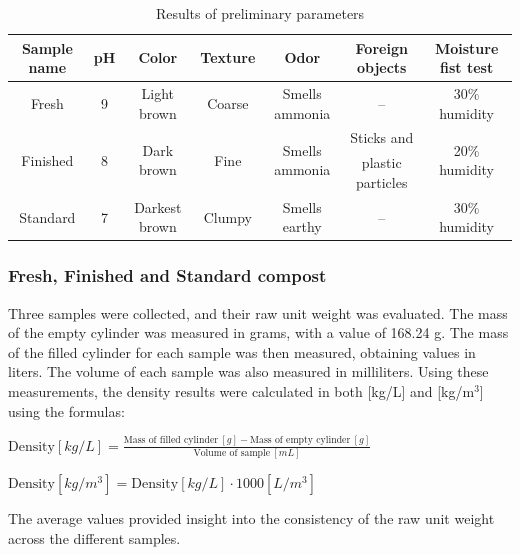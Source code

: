 \documentclass{article}
\begin{document}
\renewcommand{\arraystretch}{1.5}
\begin{table}[ht!]
    \centering \vspace{.3cm}
    \caption{Results of preliminary parameters}
    \hspace*{-.3cm}
    \begin{tabular}{|c|c|c|c|c|c|c|}
        \hline
        \textbf{Sample name} & \textbf{pH} & \textbf{Color} & \textbf{Texture} & \textbf{Odor} & \textbf{Foreign objects} & \textbf{Moisture fist test}\\
        \hline
        Fresh & 9 & Light brown & Coarse & Smells ammonia & -- & 30\% humidity\\
        \hline                                                                   
        \multirow{2}{*}{Finished} & \multirow{2}{*}{8} & \multirow{2}{*}{Dark brown} & \multirow{2}{*}{Fine} & \multirow{2}{*}{Smells ammonia} & Sticks and & \multirow{2}{*}{20\% humidity} \\
                                  &   &            &      &                & plastic particles & \\
        \hline
        Standard & 7 & Darkest brown & Clumpy & Smells earthy & -- & 30\% humidity\\
        \hline
    \end{tabular}
\end{table}
\phantom{} \vspace*{-.2cm}

\subsubsection{Fresh, Finished and Standard compost}
Three samples were collected, and their raw unit weight was evaluated.
The mass of the empty cylinder was measured in grams, with a value of
168.24 g. The mass of the filled cylinder for each sample was then
measured, obtaining values in liters. The volume of each sample was
also measured in milliliters. Using these measurements, the density
results were calculated in both [kg/L] and [kg/m$^3$] using the formulas:

$\displaystyle \text{Density} \left[kg/L\right] = \frac{\text{Mass of filled cylinder}\ [g] - \text{Mass of empty cylinder}\ [g]}{\text{Volume of sample}\ [mL]}$

$\displaystyle \text{Density} \left[kg/m^3\right] = \text{Density} \left[kg/L\right] \cdot 1000 \left[L/m^3\right]$

The average values provided insight into the consistency of the raw
unit weight across the different samples.
\end{document}
